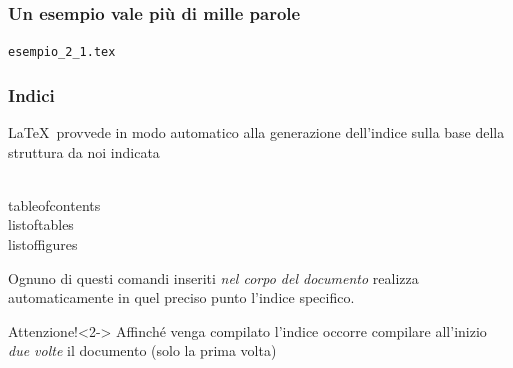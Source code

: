 \documentclass[svgnames,%
	ucs,%
	pdftex]{guitbeamer}
\begin{document}
\begin{frame}
  \frametitle{Un esempio vale pi\`u di mille parole}
	\begin{center}
		\alert{\texttt{esempio\_2\_1.tex}}
	\end{center}
\end{frame}
\begin{frame}
  \frametitle{Indici}
	\LaTeX\ provvede in modo automatico alla generazione dell'indice sulla base della struttura da noi indicata
	\begin{LaTeXcode}
		\\tableofcontents\n
		\\listoftables\n
		\\listoffigures 
	\end{LaTeXcode}
	Ognuno di questi comandi inseriti \emph{nel corpo del documento}
	realizza automaticamente in quel preciso punto l'indice specifico.
  \medskip
	\begin{block}{Attenzione!}<2->
		Affinch\'e venga compilato l'indice occorre compilare all'inizio \emph{due
		volte} il documento (solo la prima volta)
	\end{block}
\end{frame}
\end{document}
